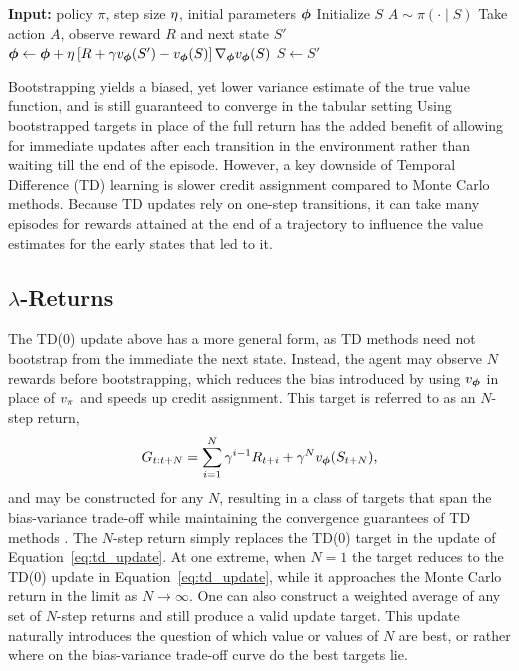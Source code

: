   \begin{algorithm}[t]
  \caption{TD(0) Policy Evaluation}
  \label{alg:td}
  \begin{algorithmic}[1]
  \State \textbf{Input:} policy $\pi$, step size $\eta$, initial parameters ${\bm \phi}$
      \State Initialize $S$
          \State $A \sim \pi(\cdot \mid S)$
          \State Take action $A$, observe reward $R$ and next state $S'$
          \State ${\bm \phi} \gets {\bm \phi} + \eta \left[ R + \gamma v_{\bm \phi}(S') - v_{\bm \phi}(S) \right] \nabla_{{\bm \phi}} v_{\bm \phi}(S)$ 
          \State $S \gets S'$
      \EndWhile
  \EndFor
  \end{algorithmic}
  \end{algorithm}
  
  Bootstrapping yields a biased, yet lower variance estimate of the true value function, and is still guaranteed to converge in the tabular setting 
  Using bootstrapped targets in place of the full return has the added benefit of allowing for immediate updates after each transition in the environment rather than waiting till the end of the episode. However, a key downside of Temporal Difference (TD) learning is slower credit assignment compared to Monte Carlo methods. Because TD updates rely on one-step transitions, it can take many episodes for rewards attained at the end of a trajectory to influence the value estimates for the early states that led to it.
  
  \subsection{$\lambda$-Returns}
  The TD(0) update above has a more general form, as TD methods need not bootstrap from the immediate the next state. Instead, the agent may observe $N$ rewards before bootstrapping, which reduces the bias introduced by using $v_{\bm \phi}$ in place of $v_{\pi}$ and speeds up credit assignment. This target is referred to as an $N$-step return,
  \begin{equation}
      G_{t:t+N} = \sum_{i=1}^{N} \gamma^{i-1} R_{t+i} + \gamma^{N} v_{\bm \phi}(S_{t+N}),
      \label{eq:nstep_return}
  \end{equation}
  and may be constructed for any $N$, resulting in a class of targets that span the bias-variance trade-off while maintaining the convergence guarantees of TD methods . The $N$-step return simply replaces the TD(0) target in the update of Equation~\eqref{eq:td_update}.
  At one extreme, when $N = 1$ the target reduces to the TD(0) update in Equation~\eqref{eq:td_update}, while it approaches the Monte Carlo return in the limit as $N \to \infty$. One can also construct a weighted average of any set of $N$-step returns and still produce a valid update target. This update naturally introduces the question of which value or values of $N$ are best, or rather where on the bias-variance trade-off curve do the best targets lie.
  

